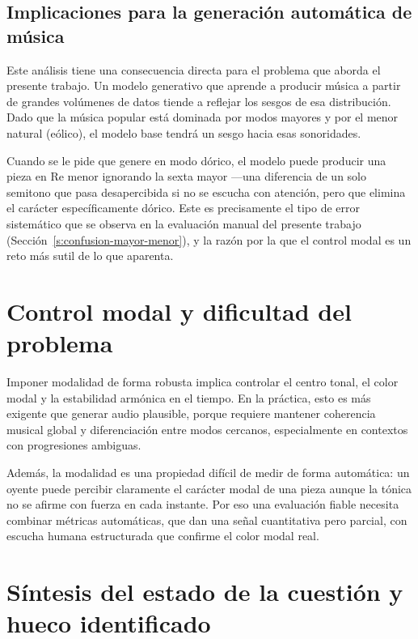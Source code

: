 \documentclass[%
    school=etsisi,%
    type=pfg,%
    degree=61CD,%
]{upm-report}
\begin{document}
\subsection{Implicaciones para la generaci\'on autom\'atica de m\'usica}

Este an\'alisis tiene una consecuencia directa para el problema que aborda el presente trabajo. Un modelo generativo que aprende a producir m\'usica a partir de grandes vol\'umenes de datos tiende a reflejar los sesgos de esa distribuci\'on. Dado que la m\'usica popular est\'a dominada por modos mayores y por el menor natural (e\'olico), el modelo base tendr\'a un sesgo hacia esas sonoridades.

Cuando se le pide que genere en modo d\'orico, el modelo puede producir una pieza en Re menor ignorando la sexta mayor ---una diferencia de un solo semitono que pasa desapercibida si no se escucha con atenci\'on, pero que elimina el car\'acter espec\'ificamente d\'orico. Este es precisamente el tipo de error sistem\'atico que se observa en la evaluaci\'on manual del presente trabajo (Secci\'on~\ref{s:confusion-mayor-menor}), y la raz\'on por la que el control modal es un reto m\'as sutil de lo que aparenta.

\section{Control modal y dificultad del problema}

Imponer modalidad de forma robusta implica controlar el centro tonal, el color modal y la estabilidad arm\'onica en el tiempo. En la pr\'actica, esto es m\'as exigente que generar audio plausible, porque requiere mantener coherencia musical global y diferenciaci\'on entre modos cercanos, especialmente en contextos con progresiones ambiguas.

Adem\'as, la modalidad es una propiedad dif\'icil de medir de forma autom\'atica: un oyente puede percibir claramente el car\'acter modal de una pieza aunque la t\'onica no se afirme con fuerza en cada instante. Por eso una evaluaci\'on fiable necesita combinar m\'etricas autom\'aticas, que dan una se\~nal cuantitativa pero parcial, con escucha humana estructurada que confirme el color modal real.

\section{S\'intesis del estado de la cuesti\'on y hueco identificado}
\end{document}
